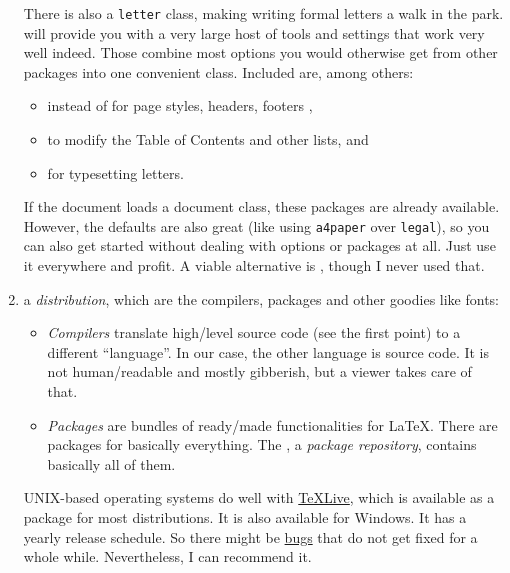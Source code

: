 \begin{enumerate}
        There is also a \texttt{letter} class, making writing formal letters a walk
        in the park.
         will provide you with a very large host of tools
        and settings that work very well indeed.
        Those combine most options you would otherwise get from other packages into
        one convenient class.
        Included are, among others:
        \begin{itemize}
            \item {} instead of  for
                page styles, headers, footers ,
            \item {} to modify the Table of Contents and other lists,
                and
            \item {} for typesetting letters.
        \end{itemize}
        If the document loads a  document class, these
        packages are already available.
        However, the  defaults are also great
        (like using \texttt{a4paper} over \texttt{legal}),
        so you can also get started without dealing with options or packages at all.
        Just use it everywhere and profit.
        A viable alternative is , though I never used that.
    \item a \emph{distribution}, which are the compilers, packages and other
        goodies like fonts:
        \begin{itemize}
            \item \emph{Compilers} translate high\-/level source code (see the
                first point) to a different \enquote{language}.
                In our case, the other language is 
                source code.
                It is not human\-/readable and mostly gibberish, but a
                 viewer takes care of that.
            \item \emph{Packages} are bundles of ready\-/made functionalities for
                \LaTeX{}.
                There are packages for basically everything.
                The \href{https://ctan.org/}{},
                a \emph{package repository}, contains basically all of them.
        \end{itemize}
       UNIX-based operating systems do well with
       \href{https://www.tug.org/texlive/}{TeXLive},
       which is available as a package for most distributions.
       It is also available for Windows.
       It has a yearly release schedule.
       So there might be \href{https://tex.stackexchange.com/a/476742/120853}{bugs}
       that do not get fixed for a whole while.
       Nevertheless, I can recommend it.


\end{enumerate}
